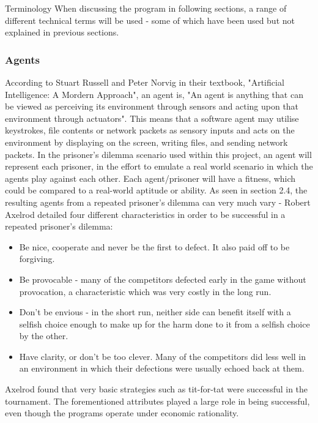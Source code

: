 \documentclass[12pt,a4paper]{article}
\makeatletter
\renewcommand\subsection{\@startsection {subsection}{1}{2mm}
                               {3pt plus 2pt minus 1pt}
                               {3pt plus 0pt}
                               {\normalfont\bfseries}}
\makeatother
\begin{document}
\subsection{Terminology}
When discussing the program in following sections, a range of different technical terms will be used - some of which have been used but not explained in previous sections.

\subsubsection{Agents}
According to Stuart Russell and Peter Norvig in their textbook, "Artificial Intelligence: A Mordern Approach", an agent is, "An agent is anything that can be viewed as perceiving its environment through sensors and acting upon that environment through actuators". This means that a software agent may utilise keystrokes, file contents or network packets as sensory inputs and acts on the environment by displaying on the screen, writing files, and sending network packets. In the prisoner's dilemma scenario used within this project, an agent will represent each prisoner, in the effort to emulate a real world scenario in which the agents play against each other. Each agent/prisoner will have a fitness, which could be compared to a real-world aptitude or ability. As seen in section 2.4, the resulting agents from a repeated prisoner's dilemma can very much vary - Robert Axelrod detailed four different characteristics in order to be successful in a repeated prisoner's dilemma:

\begin{itemize}
  \item Be nice, cooperate and never be the first to defect. It also paid off to be forgiving.
  \item Be provocable - many of the competitors defected early in the game without provocation, a characteristic which was very costly in the long run.
  \item Don't be envious - in the short run, neither side can benefit itself with a selfish choice enough to make up for the harm done to it from a selfish choice by the other.
  \item Have clarity, or don't be too clever. Many of the competitors did less well in an environment in which their defections were usually echoed back at them. \\
\end{itemize}

Axelrod found that very basic strategies such as tit-for-tat were successful in the tournament. The forementioned attributes played a large role in being successful, even though the programs operate under economic rationality.
\end{document}

